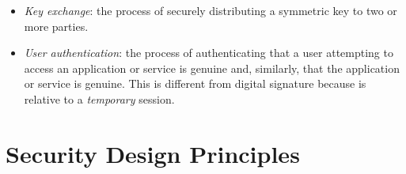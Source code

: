 \documentclass[oneside]{academica}
\begin{document}
\begin{itemize}
\begin{itemize}
        This implements non-repudation, which implies authentication.
      \item \textit{Key exchange}: the process of securely distributing a symmetric key to two or more parties.
      \item \textit{User authentication}: the process of authenticating that a user attempting to access an application or service is genuine and, similarly, that the application or service is genuine.
        This is different from digital signature because is relative to a \textit{temporary} session.
    \end{itemize}
\end{itemize}

\section{Security Design Principles}
\end{document}
